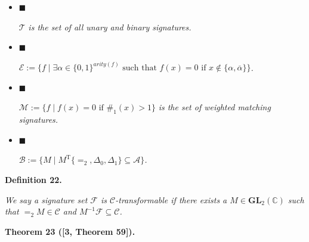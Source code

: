 \documentclass[10pt,a4paper]{article}
\begin{document}
\begin{itemize}


\item[] 
$\blacksquare$ 


$\mathcal{T}$\emph{ is the set of all unary and binary signatures.}\par





\item[] 
$\blacksquare$ 


$\mathcal{E}:=\{f\mid\exists\alpha\in\{0,1\}^{arity(f)}\text{ such that }f(x)=0\text{ if }x\notin\{\alpha,\overline{\alpha}\}\}$\emph{.}\par





\item[] 
$\blacksquare$ 


$\mathcal{M}:=\{f\mid f(x)=0\text{ if }\#_{1}(x)>1\}$\emph{ is the set of weighted matching signatures.}\par





\item[] 
$\blacksquare$ 


$\mathcal{B}:=\{M\mid M^{\mathrm{T}}\{=_{2},\Delta_{0},\Delta_{1}\}\subseteq\mathscr{A}\}$\emph{.}\par





\end{itemize}







\par\medskip\noindent\textbf{
\textbf{Definition 22}\textbf{.}
}\par



\emph{We say a signature set $\mathcal{F}$ is $\mathscr{C}$-transformable if there exists a $M\in\textbf{GL}_{2}(\mathbb{C})$ such that $=_{2}M\in\mathscr{C}$ and $M^{-1}\mathcal{F}\subseteq\mathscr{C}$.}\par







\par\medskip\noindent\textbf{
\textbf{Theorem 23}\textbf{ }([3, Theorem 59])\textbf{.}
}\par
\end{document}
